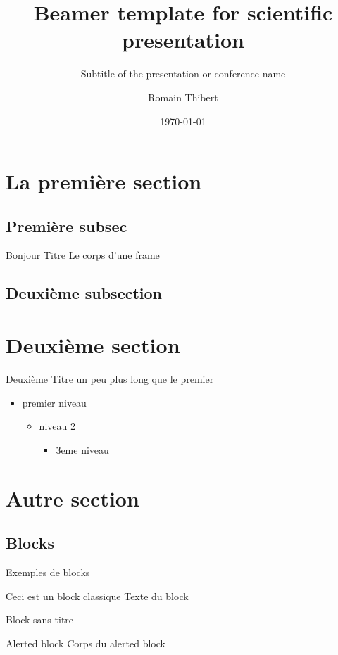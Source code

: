 \documentclass[aspectratio=169]{beamer}
\title{Beamer template for scientific presentation}
\subtitle{Subtitle of the presentation or conference name}
\author[R.Thibert]{Romain Thibert}
\date{\today}
\institute[\url{https://lurpa.ens-paris-saclay.fr}]{4 Avenue des Sciences, 91190 Gif-sur-Yvette, France}
\begin{document}

\section{La première section}

\subsection{Première subsec}

\begin{frame}{Bonjour Titre}
Le corps d'une frame
\end{frame}

\subsection{Deuxième subsection}

\section{Deuxième section}

\begin{frame}{Deuxième Titre un peu plus long que le premier}
\begin{itemize}
    \item premier niveau
    \begin{itemize}
        \item niveau 2
        \begin{itemize}
            \item 3eme niveau
        \end{itemize}
    \end{itemize}
\end{itemize}
\end{frame}

\section{Autre section}

\subsection{Blocks}

\begin{frame}{Exemples de blocks}
    \begin{block}{Ceci est un block classique}
        Texte du block
    \end{block}
    \begin{block}{}
        Block sans titre
    \end{block}
    \begin{alertblock}{Alerted block}
        Corps du alerted block
    \end{alertblock}
\end{frame}
\end{document}
